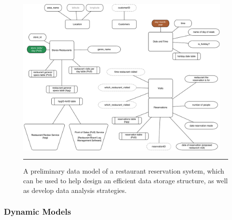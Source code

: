 \begin{figure}[!t]
	\centering
		\includegraphics[width=0.96\textwidth]{images/SIM/data-systemmodel.pdf}
	\caption[\small An example of a data model]{\small A preliminary data model of a restaurant reservation system, which can be used to help design an efficient data storage structure, as well as develop data analysis strategies.}
	\label{simfig:3}\hrule
\end{figure}


\subsubsection{Dynamic Models}

